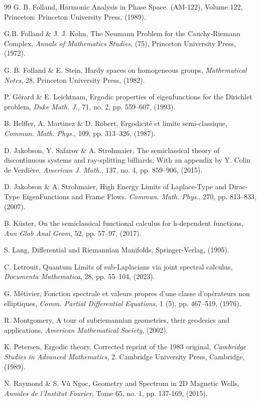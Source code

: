 \documentclass[12pt,a4paper]{amsart}
\theoremstyle{plain}
\theoremstyle{definition}
\theoremstyle{remark}
\numberwithin{equation}{section}
\theoremstyle{definition}
\numberwithin{equation}{section}
\begin{document}
\begin{thebibliography}{99}
 G. B. Folland, Harmonic Analysis in Phase Space. (AM-122), Volume 122, Princeton: Princeton University Press, (1989).

 G.B. Folland \& J. J. Kohn, The Neumann Problem for the Cauchy-Riemann Complex, {\it Annals of Mathematics Studies}, (75), Princeton University Press, (1972).
  
 G. B. Folland \& E. Stein, Hardy spaces on homogeneous groups, {\it Mathematical Notes}, 28, Princeton University Press, (1982).

 P. Gérard \& E. Leichtnam, Ergodic properties of eigenfunctions for the Dirichlet problem, {\it Duke Math. J.}, 71, no. 2, pp. 559–607, (1993).


 B. Helffer, A. Martinez \& D. Robert, Ergodicité et limite semi-classique, {\it Commun. Math. Phys.}, 109, pp. 313–326, (1987).

 D. Jakobson, Y. Safarov \& A. Strohmaier, The semiclassical theory of discontinuous systems and ray-splitting billiards, With an appendix by Y. Colin de Verdière, {\it American J. Math.}, 137, no. 4, pp. 859–906, (2015).

 D. Jakobson \& A. Strohmaier, High Energy Limits of Laplace-Type and Dirac-Type EigenFunctions and Frame Flows. {\it Commun. Math. Phys.}, 270, pp. 813–833, (2007).

 B. Küster, On the semiclassical functional calculus for h-dependent functions, {\it Ann Glob Anal Geom}, 52, pp. 57–97, (2017).

 S. Lang, Differential and Riemannian Manifolds, Springer-Verlag, (1995).

 C. Letrouit, Quantum Limits of sub-Laplacians via joint spectral calculus, {\it Documenta Mathematica}, 28, pp. 55–104, (2023).

 G. Métivier, Fonction spectrale et valeurs propres d’une classe d’opérateurs non elliptiques, {\it Comm. Partial Differential Equations}, 1 (5), pp. 467–519, (1976).

 R. Montgomery, A tour of subriemannian geometries, their geodesics and applications, {\it American Mathematical Society}, (2002).

 K. Petersen, Ergodic theory, Corrected reprint of the 1983 original, {\it Cambridge Studies in Advanced Mathematics}, 2. Cambridge University Press, Cambridge, (1989).


 N. Raymond \& S. V\~u Ngoc, Geometry and Spectrum in 2D Magnetic Wells, {\it Annales de l'Institut Fourier}, Tome 65, no. 1, pp. 137-169, (2015). 


\end{thebibliography}
\end{document}
